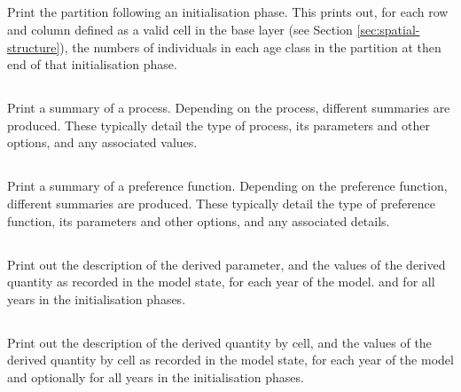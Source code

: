 \subsection{}

Print the partition following an initialisation phase. This prints out, for each row and column defined as a valid cell in the base layer (see Section \ref{sec:spatial-structure}), the numbers of individuals in each age class in the partition at then end of that initialisation phase.

\subsection{}

Print a summary of a process. Depending on the process, different summaries are produced. These typically detail the type of process, its parameters and other options, and any associated values.

\subsection{}

Print a summary of a preference function. Depending on the preference function, different summaries are produced. These typically detail the type of preference function, its parameters and other options, and any associated details.

\subsection{}

Print out the description of the derived parameter, and the values of the derived quantity as recorded in the model state, for each year of the model. and for all years in the  initialisation phases.

\subsection{}

Print out the description of the derived quantity by cell, and the values of the derived quantity by cell as recorded in the model state, for each year of the model and optionally for all years in the initialisation phases. 


